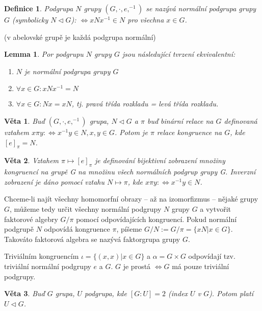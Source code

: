 \documentclass[a4paper, 11pt]{report}
\newtheorem{mydef}{Definice}[chapter]
\newtheorem{veta}{Věta}
\newtheorem{lemma}{Lemma}
\begin{document}
\begin{mydef}
Podgrupa $N$ grupy $(G, \cdot, e, ^{-1})$ se nazývá normální podgrupa grupy $G$ (symbolicky $N \triangleleft G$): $\Leftrightarrow x N x^{-1} \in N$ pro všechna $x \in G$.
\end{mydef}
(v abelovské grupě je každá podgrupa normální)

\begin{lemma}
Por podgrupu $N$ grupy $G$ jsou následující tvrzení ekvivalentní:
\begin{enumerate}
	\item $N$ je normální podgrupa grupy $G$
	\item $\forall x \in G: x N x^{-1} = N$
	\item $\forall x \in G: N x = x N$, tj. pravá třída rozkladu = levá třída rozkladu.
\end{enumerate}
\end{lemma}

\begin{veta}
Buď $(G, \cdot, e, ^{-1})$ grupa, $N \triangleleft G$ a $\pi$ buď binární relace na $G$ definovaná vztahem $x \pi y: \Leftrightarrow x^{-1}y \in N, x,y \in G$. Potom je $\pi$ relace kongruence na $G$, kde $[e]_\pi = N$.
\end{veta}

\begin{veta}
Vztahem $\pi \mapsto [e]_\pi$ je definování bijektivní zobrazení množiny kongruencí na grupě G na množinu všech normálních podgrup grupy G. Inverzní zobrazení je dáno pomocí vztahu $N \mapsto \pi$, kde $x \pi y: \Leftrightarrow x^{-1}y \in N$.
\end{veta}

Chceme-li najít všechny homomorfní obrazy -- až na izomorfizmus -- nějaké grupy $G$, můžeme tedy určit všechny normální podgrupy $N$ grupy $G$ a vytvořit faktorové algebry $G/\pi$ pomocí odpovídajících kongruencí. Pokud normální podgrupě $N$ odpovídá kongruence $\pi$, píšeme $G/N := G/\pi = \{x N | x \in G\}$. Takováto faktorová algebra se nazývá faktorgrupa grupy $G$.

Triviálním kongruencím $\iota = \{(x, x) | x \in G\}$ a $\alpha = G \times G$ odpovídají tzv. triviální normální podgrupy ${e}$ a $G$. $G$ je prostá $\Leftrightarrow G$ má pouze triviální podgrupy.

\begin{veta}
Buď $G$ grupa, $U$ podgrupa, kde $[G:U] = 2$ (index $U$ v $G$). Potom platí $U \triangleleft G$.
\end{veta}
\end{document}

